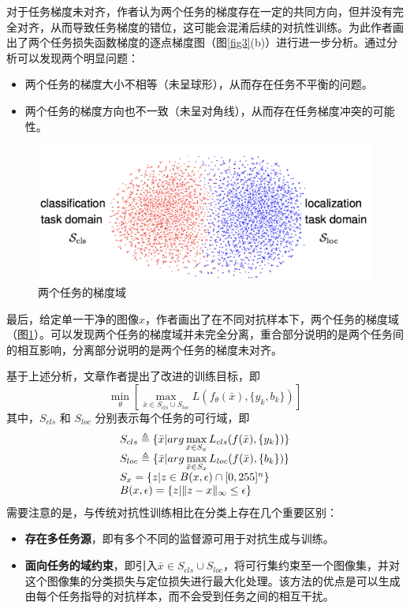 \documentclass[conference,10pt]{IEEEtran}
\begin{document}
对于任务梯度未对齐，作者认为两个任务的梯度存在一定的共同方向，但并没有完全对齐，从而导致任务梯度的错位，这可能会混淆后续的对抗性训练。为此作者画出了两个任务损失函数梯度的逐点梯度图（图\ref{fig3}(b)）进行进一步分析。通过分析可以发现两个明显问题：
\begin{itemize}
	\item 两个任务的梯度大小不相等（未呈球形），从而存在任务不平衡的问题。
	\item 两个任务的梯度方向也不一致（未呈对角线），从而存在任务梯度冲突的可能性。
\end{itemize}
\begin{figure}[H]
	\centering
	\includegraphics[scale=0.3]{figure/fig4.png}
	\caption{两个任务的梯度域}
	\label{fig4}
\end{figure}

最后，给定单一干净的图像$x$，作者画出了在不同对抗样本下，两个任务的梯度域（图\ref{fig4}）。可以发现两个任务的梯度域并未完全分离，重合部分说明的是两个任务间的相互影响，分离部分说明的是两个任务的梯度未对齐。

基于上述分析，文章作者提出了改进的训练目标，即
$$
\min\limits_\theta[\max\limits_{\bar{x}\in S_{cls}\cup S_{loc}} L(f_\theta(\bar{x}), \{y_k,b_k\})]
$$
其中，$S_{cls}$ 和 $S_{loc}$ 分别表示每个任务的可行域，即
$$
\begin{array}[l]{l}
	S_{cls}\triangleq \{\bar{x}\vert arg\max\limits_{\bar{x}\in S_{x}} L_{cls}(f(\bar{x}), \{y_k\})\}\\
	S_{loc}\triangleq \{\bar{x}\vert arg\max\limits_{\bar{x}\in S_{x}} L_{loc}(f(\bar{x}), \{b_k\})\}\\
	S_x = \{z\vert z\in B(x,\epsilon)\cap [0,255]^n\}\\
	B(x,\epsilon) = \{z\vert \Vert z-x\Vert_\infty \leq \epsilon\}
\end{array}
$$
需要注意的是，与传统对抗性训练相比在分类上存在几个重要区别：
\begin{itemize}
	\item \textbf{存在多任务源}，即有多个不同的监督源可用于对抗生成与训练。
	\item \textbf{面向任务的域约束}，即引入$\bar{x}\in S_{cls}\cup S_{loc}$，将可行集约束至一个图像集，并对这个图像集的分类损失与定位损失进行最大化处理。该方法的优点是可以生成由每个任务指导的对抗样本，而不会受到任务之间的相互干扰。
\end{itemize}
\end{document}

